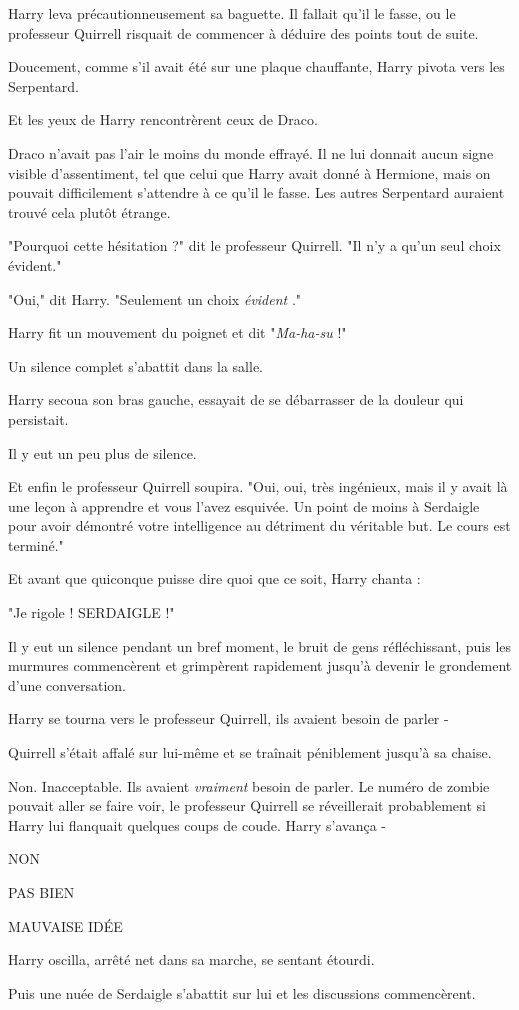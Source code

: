 Harry leva précautionneusement sa baguette. Il fallait qu'il le fasse, ou le professeur Quirrell risquait de commencer à déduire des points tout de suite.

Doucement, comme s'il avait été sur une plaque chauffante, Harry pivota vers les Serpentard.

Et les yeux de Harry rencontrèrent ceux de Draco.

Draco n'avait pas l'air le moins du monde effrayé. Il ne lui donnait aucun signe visible d'assentiment, tel que celui que Harry avait donné à Hermione, mais on pouvait difficilement s'attendre à ce qu'il le fasse. Les autres Serpentard auraient trouvé cela plutôt étrange.

"Pourquoi cette hésitation ?" dit le professeur Quirrell. "Il n'y a qu'un seul choix évident."

"Oui," dit Harry. "Seulement un choix \emph{évident} ."

Harry fit un mouvement du poignet et dit "\emph{Ma-ha-su}  !"

Un silence complet s'abattit dans la salle.

Harry secoua son bras gauche, essayait de se débarrasser de la douleur qui persistait.

Il y eut un peu plus de silence.

Et enfin le professeur Quirrell soupira. "Oui, oui, très ingénieux, mais il y avait là une leçon à apprendre et vous l'avez esquivée. Un point de moins à Serdaigle pour avoir démontré votre intelligence au détriment du véritable but. Le cours est terminé."

Et avant que quiconque puisse dire quoi que ce soit, Harry chanta :

"Je rigole ! SERDAIGLE !"

Il y eut un silence pendant un bref moment, le bruit de gens réfléchissant, puis les murmures commencèrent et grimpèrent rapidement jusqu'à devenir le grondement d'une conversation.

Harry se tourna vers le professeur Quirrell, ils avaient besoin de parler -

Quirrell s'était affalé sur lui-même et se traînait péniblement jusqu'à sa chaise.

Non. Inacceptable. Ils avaient \emph{vraiment}  besoin de parler. Le numéro de zombie pouvait aller se faire voir, le professeur Quirrell se réveillerait probablement si Harry lui flanquait quelques coups de coude. Harry s'avança -

NON

PAS BIEN

MAUVAISE IDÉE

Harry oscilla, arrêté net dans sa marche, se sentant étourdi.

Puis une nuée de Serdaigle s'abattit sur lui et les discussions commencèrent.


